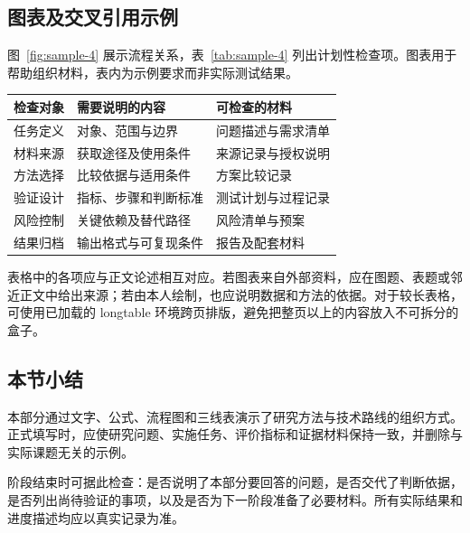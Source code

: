 \subsection{图表及交叉引用示例}
图~\ref{fig:sample-4} 展示流程关系，表~\ref{tab:sample-4} 列出计划性检查项。图表用于帮助组织材料，表内为示例要求而非实际测试结果。
\begin{center}
\begin{minipage}{\linewidth}\centering
{}
\label{fig:sample-4}
\end{minipage}\end{center}
\begin{center}\begin{minipage}{\linewidth}\centering
{}\label{tab:sample-4}
\begin{tabularx}{\linewidth}{p{23mm}XX}
\toprule
检查对象 & 需要说明的内容 & 可检查的材料\\
\midrule
任务定义 & 对象、范围与边界 & 问题描述与需求清单\\
材料来源 & 获取途径及使用条件 & 来源记录与授权说明\\
方法选择 & 比较依据与适用条件 & 方案比较记录\\
验证设计 & 指标、步骤和判断标准 & 测试计划与过程记录\\
风险控制 & 关键依赖及替代路径 & 风险清单与预案\\
结果归档 & 输出格式与可复现条件 & 报告及配套材料\\
\bottomrule
\end{tabularx}
\end{minipage}\end{center}
表格中的各项应与正文论述相互对应。若图表来自外部资料，应在图题、表题或邻近正文中给出来源；若由本人绘制，也应说明数据和方法的依据。对于较长表格，可使用已加载的 longtable 环境跨页排版，避免把整页以上的内容放入不可拆分的盒子。

\subsection{本节小结}
本部分通过文字、公式、流程图和三线表演示了研究方法与技术路线的组织方式。正式填写时，应使研究问题、实施任务、评价指标和证据材料保持一致，并删除与实际课题无关的示例。

阶段结束时可据此检查：是否说明了本部分要回答的问题，是否交代了判断依据，是否列出尚待验证的事项，以及是否为下一阶段准备了必要材料。所有实际结果和进度描述均应以真实记录为准。
